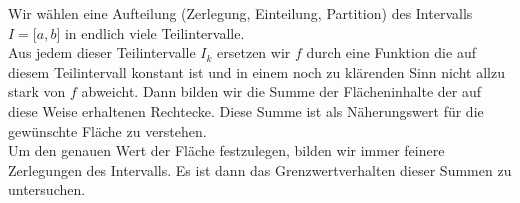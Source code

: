 \begin{enumerate}[\indent I)]
\begin{center}
\end{center}

Wir wählen eine Aufteilung (Zerlegung, Einteilung, Partition) des Intervalls $I=\lbrack a,b\rbrack$ in endlich viele Teilintervalle. \\

Aus jedem dieser Teilintervalle $I_k$ ersetzen wir $f$ durch eine Funktion die auf diesem Teilintervall konstant ist und in einem noch zu klärenden Sinn nicht allzu stark von $f$ abweicht. Dann bilden wir die Summe der Flächeninhalte der auf diese Weise erhaltenen Rechtecke. Diese Summe ist als Näherungswert für die gewünschte Fläche zu verstehen. \\

Um den genauen Wert der Fläche festzulegen, bilden wir immer feinere Zerlegungen des Intervalls. Es ist dann das Grenzwertverhalten dieser Summen zu untersuchen.
\end{enumerate}
